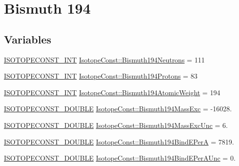 \hypertarget{group___isotope_const-_bismuth-_bi194}{}\section{Bismuth 194}
\label{group___isotope_const-_bismuth-_bi194}
\subsection*{Variables}
\begin{DoxyCompactItemize}
\item 
\mbox{\hyperlink{group___isotope_const-_macros_ga5f18360b3e99483a35c32d789e62621c}{I\+S\+O\+T\+O\+P\+E\+C\+O\+N\+S\+T\+\_\+\+I\+NT}} \mbox{\hyperlink{group___isotope_const-_bismuth-_bi194_gadcac48c30c6f179c73f19744dcbb2c31}{Isotope\+Const\+::\+Bismuth194\+Neutrons}} = 111
\item 
\mbox{\hyperlink{group___isotope_const-_macros_ga5f18360b3e99483a35c32d789e62621c}{I\+S\+O\+T\+O\+P\+E\+C\+O\+N\+S\+T\+\_\+\+I\+NT}} \mbox{\hyperlink{group___isotope_const-_bismuth-_bi194_ga48a977df82f607a59d0b798dfa7ec475}{Isotope\+Const\+::\+Bismuth194\+Protons}} = 83
\item 
\mbox{\hyperlink{group___isotope_const-_macros_ga5f18360b3e99483a35c32d789e62621c}{I\+S\+O\+T\+O\+P\+E\+C\+O\+N\+S\+T\+\_\+\+I\+NT}} \mbox{\hyperlink{group___isotope_const-_bismuth-_bi194_ga86c3e40a28ec17afe7687538025cbde0}{Isotope\+Const\+::\+Bismuth194\+Atomic\+Weight}} = 194
\item 
\mbox{\hyperlink{group___isotope_const-_macros_ga8f45a7272ce02c0b4c65c44636ed719a}{I\+S\+O\+T\+O\+P\+E\+C\+O\+N\+S\+T\+\_\+\+D\+O\+U\+B\+LE}} \mbox{\hyperlink{group___isotope_const-_bismuth-_bi194_gae26816a58102809a02ce1df555b26a5f}{Isotope\+Const\+::\+Bismuth194\+Mass\+Exc}} = -\/16028.
\item 
\mbox{\hyperlink{group___isotope_const-_macros_ga8f45a7272ce02c0b4c65c44636ed719a}{I\+S\+O\+T\+O\+P\+E\+C\+O\+N\+S\+T\+\_\+\+D\+O\+U\+B\+LE}} \mbox{\hyperlink{group___isotope_const-_bismuth-_bi194_ga5c9c9eeaac6c0d5aa1840e0b27a3be35}{Isotope\+Const\+::\+Bismuth194\+Mass\+Exc\+Unc}} = 6.
\item 
\mbox{\hyperlink{group___isotope_const-_macros_ga8f45a7272ce02c0b4c65c44636ed719a}{I\+S\+O\+T\+O\+P\+E\+C\+O\+N\+S\+T\+\_\+\+D\+O\+U\+B\+LE}} \mbox{\hyperlink{group___isotope_const-_bismuth-_bi194_gad617f801c6bfc3e76fc96161812679c2}{Isotope\+Const\+::\+Bismuth194\+Bind\+E\+PerA}} = 7819.
\item 
\mbox{\hyperlink{group___isotope_const-_macros_ga8f45a7272ce02c0b4c65c44636ed719a}{I\+S\+O\+T\+O\+P\+E\+C\+O\+N\+S\+T\+\_\+\+D\+O\+U\+B\+LE}} \mbox{\hyperlink{group___isotope_const-_bismuth-_bi194_ga0e87cbcd296677fe8337bc8ba4a93326}{Isotope\+Const\+::\+Bismuth194\+Bind\+E\+Per\+A\+Unc}} = 0.

\end{DoxyCompactItemize}
